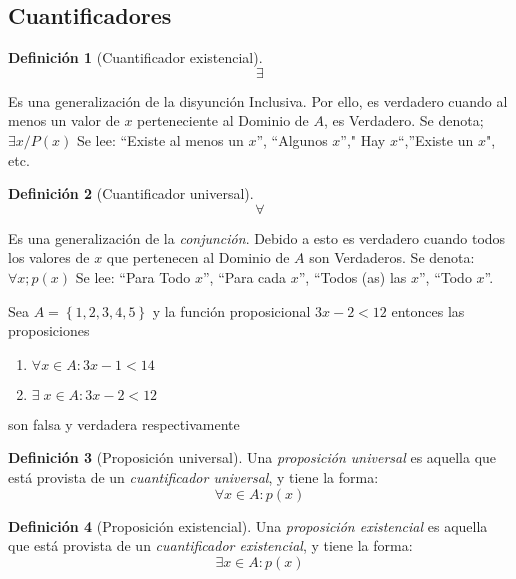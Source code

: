 \documentclass[
  16pt,
]{krantz}
\providecommand{\tightlist}{%
  \setlength{\itemsep}{0pt}\setlength{\parskip}{0pt}}
\theoremstyle{definition}
\newtheorem{definition}{Definición}[chapter]
\theoremstyle{definition}
\theoremstyle{definition}
\theoremstyle{definition}
\theoremstyle{remark}
\begin{document}
\hypertarget{cuantificadores}{%
\subsection{Cuantificadores}\label{cuantificadores}}

\begin{definition}[Cuantificador existencial]
\protect\hypertarget{def:existencial}{}{\label{def:existencial} \iffalse (Cuantificador existencial) \fi{} }
\[
\exists
\]

Es una generalización de la disyunción Inclusiva. Por ello, es verdadero cuando al menos un valor de \(x\) perteneciente al Dominio de \(A\), es Verdadero. Se denota; \(\exists x / P (x)\) Se lee: ``Existe al menos un \(x\)'', ``Algunos \(x\)''," Hay \(x\)``,''Existe un \(x\)", etc.
\end{definition}

\begin{definition}[Cuantificador universal]
\protect\hypertarget{def:universal}{}{\label{def:universal} \iffalse (Cuantificador universal) \fi{} }
\[
\forall
\]

Es una generalización de la \emph{conjunción}. Debido a esto es verdadero cuando todos los valores de \(x\) que pertenecen al Dominio de \(A\) son Verdaderos. Se denota: \(\forall x ; p(x)\) Se lee: ``Para Todo \(x\)'', ``Para cada \(x\)'', ``Todos (as) las \(x\)'', ``Todo \(x\)''.
\end{definition}

Sea \(A=\left\{1,2,3,4,5\right\}\) y la función proposicional \(3x-2<12\) entonces las proposiciones

\begin{enumerate}
\def\labelenumi{\arabic{enumi}.}
\tightlist
\item
  \(\forall x\in A:3x-1<14\)
\item
  \(\exists\; x\in A:3x-2<12\)
\end{enumerate}

son falsa y verdadera respectivamente

\begin{definition}[Proposición universal]
\protect\hypertarget{def:universal2}{}{\label{def:universal2} \iffalse (Proposición universal) \fi{} }Una \emph{proposición universal} es aquella que está provista de un \emph{cuantificador universal}, y tiene la forma: \[\forall x\in A:p(x)\]
\end{definition}

\begin{definition}[Proposición existencial]
\protect\hypertarget{def:existencial2}{}{\label{def:existencial2} \iffalse (Proposición existencial) \fi{} }Una \emph{proposición existencial} es aquella que está provista de un \emph{cuantificador existencial}, y tiene la forma: \[\exists x\in A:p(x)\]
\end{definition}
\end{document}
